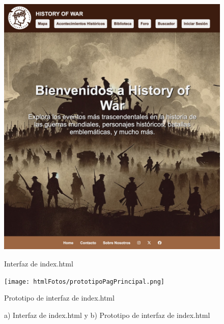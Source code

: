 \documentclass{article}
\begin{document}
\begin{figure}[H]
    \centering
    \begin{minipage}{0.49\textwidth}
        \includegraphics[width=\linewidth]{htmlFotos/pagPrincipal.png}
        \caption{Interfaz de index.html} %
    \end{minipage}\hfill
    \begin{minipage}{0.49\textwidth}
        \texttt{[image: htmlFotos/prototipoPagPrincipal.png]}
        \caption{Prototipo de interfaz de index.html} %
    \end{minipage}
    \caption{a) Interfaz de index.html y b) Prototipo de interfaz de index.html} %
    \label{fig:interfaz_y_prototipo}
\end{figure}
\end{document}
